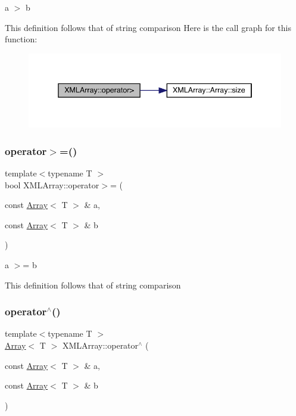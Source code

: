 a $>$ b 

This definition follows that of string comparison Here is the call graph for this function\+:\nopagebreak
\begin{figure}[H]
\begin{center}
\leavevmode
\includegraphics[width=338pt]{dd/db1/namespaceXMLArray_ad9684cbf7b3089e446a523042d2818c1_cgraph}
\end{center}
\end{figure}
\mbox{\label{namespaceXMLArray_a77b282c1c52b2e07215ed808a0646e10}} 
\subsubsection{\texorpdfstring{operator$>$=()}{operator>=()}}
{\footnotesize\ttfamily template$<$typename T $>$ \\
bool X\+M\+L\+Array\+::operator$>$= (\begin{DoxyParamCaption}\item[{const \mbox{\hyperlink{classXMLArray_1_1Array}{Array}}$<$ T $>$ \&}]{a,  }\item[{const \mbox{\hyperlink{classXMLArray_1_1Array}{Array}}$<$ T $>$ \&}]{b }\end{DoxyParamCaption})\hspace{0.3cm}{\ttfamily [inline]}}



a $>$= b 

This definition follows that of string comparison \mbox{\label{namespaceXMLArray_a2aca927799841b80136c3d48bc8d3e29}} 
\subsubsection{\texorpdfstring{operator$^\wedge$()}{operator^()}}
{\footnotesize\ttfamily template$<$typename T $>$ \\
\mbox{\hyperlink{classXMLArray_1_1Array}{Array}}$<$ T $>$ X\+M\+L\+Array\+::operator$^\wedge$ (\begin{DoxyParamCaption}\item[{const \mbox{\hyperlink{classXMLArray_1_1Array}{Array}}$<$ T $>$ \&}]{a,  }\item[{const \mbox{\hyperlink{classXMLArray_1_1Array}{Array}}$<$ T $>$ \&}]{b }\end{DoxyParamCaption})\hspace{0.3cm}{\ttfamily [inline]}}



